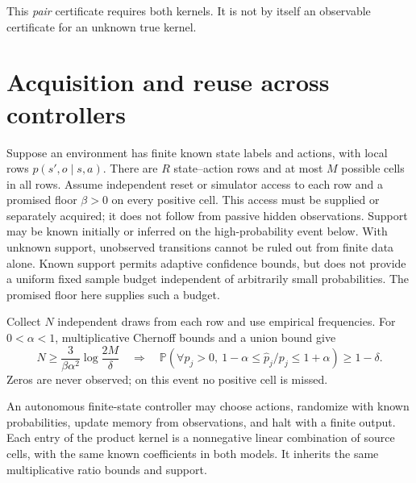 \documentclass[11pt]{article}
\newcommand{\Prb}{\mathbb P}
\begin{document}
This \emph{pair} certificate requires both kernels. It is not by itself an
observable certificate for an unknown true kernel.

\section{Acquisition and reuse across controllers}

Suppose an environment has finite known state labels and actions, with
local rows $p(s',o\mid s,a)$. There are $R$ state--action rows and at most
$M$ possible cells in all rows. Assume independent reset or simulator
access to each row and a promised floor $\beta>0$ on every positive cell.
This access must be supplied or separately acquired; it does not follow
from passive hidden observations. Support may be known initially or
inferred on the high-probability event below. With unknown support,
unobserved transitions cannot be ruled out from finite data alone.
Known support permits adaptive confidence bounds, but does not provide a
uniform fixed sample budget independent of arbitrarily small probabilities.
The promised floor here supplies such a budget.

Collect $N$ independent draws from each row and use empirical frequencies.
For $0<\alpha<1$, multiplicative Chernoff bounds and a union bound give
\[
 N\ge\frac{3}{\beta\alpha^2}\log\frac{2M}{\delta}
 \quad\Longrightarrow\quad
 \Prb\left(\forall p_j>0,\
       1-\alpha\le\widehat p_j/p_j\le1+\alpha\right)\ge1-\delta.
\]
Zeros are never observed; on this event no positive cell is missed.

An autonomous finite-state controller may choose actions, randomize with
known probabilities, update memory from observations, and halt with a
finite output. Each entry of the product kernel is a nonnegative linear
combination of source cells, with the same known coefficients in both
models. It inherits the same multiplicative ratio bounds and support.
\end{document}
